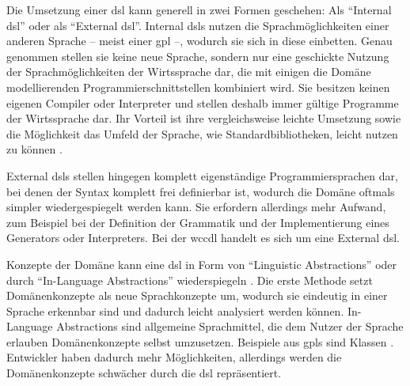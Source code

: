     Die Umsetzung einer \gls{dsl} kann generell in zwei Formen geschehen:
    Als "`Internal \gls{dsl}"' oder als "`External \gls{dsl}"'.
    Internal \glspl{dsl} nutzen die Sprachmöglichkeiten einer anderen Sprache
    -- meist einer \gls{gpl} --, wodurch sie sich in diese einbetten.
    Genau genommen stellen sie keine neue Sprache,
    sondern nur eine geschickte Nutzung der Sprachmöglichkeiten
    der Wirtssprache dar, die mit einigen die Domäne modellierenden Programmierschnittstellen kombiniert wird.
    Sie besitzen keinen eigenen Compiler oder Interpreter und stellen deshalb immer gültige Programme
    der Wirtssprache dar.
    Ihr Vorteil ist ihre vergleichsweise leichte Umsetzung sowie die Möglichkeit das Umfeld der Sprache,
    wie Standardbibliotheken, leicht nutzen zu können
    \cite[Kapitel 2.8.1]{voelter:DslEngineering}.

    External \glspl{dsl} stellen hingegen komplett eigenständige Programmiersprachen dar,
    bei denen der Syntax komplett frei definierbar ist,
    wodurch die Domäne oftmals simpler wiedergespiegelt werden kann.
    Sie erfordern allerdings mehr Aufwand, zum Beispiel bei der Definition der Grammatik
    und der Implementierung eines Generators oder Interpreters.
    Bei der \gls{wccdl} handelt es sich um eine External \gls{dsl}.

    Konzepte der Domäne kann eine \gls{dsl} in Form von
    "`Linguistic Abstractions"' oder durch "`In-Language Abstractions"'
    wiederspiegeln \cite[Kapitel 4.1.2]{voelter:DslEngineering}.
    Die erste Methode setzt Domänenkonzepte als neue Sprachkonzepte um,
    wodurch sie eindeutig in einer Sprache erkennbar sind
    und dadurch leicht analysiert werden können.
    In-Language Abstractions sind allgemeine Sprachmittel,
    die dem Nutzer der Sprache erlauben Domänenkonzepte selbst umzusetzen.
    Beispiele aus \glspl{gpl} sind Klassen
    \cite[Kapitel 4.1.2]{voelter:DslEngineering}.
    Entwickler haben dadurch mehr Möglichkeiten,
    allerdings werden die Domänenkonzepte schwächer durch die \gls{dsl}
    repräsentiert.